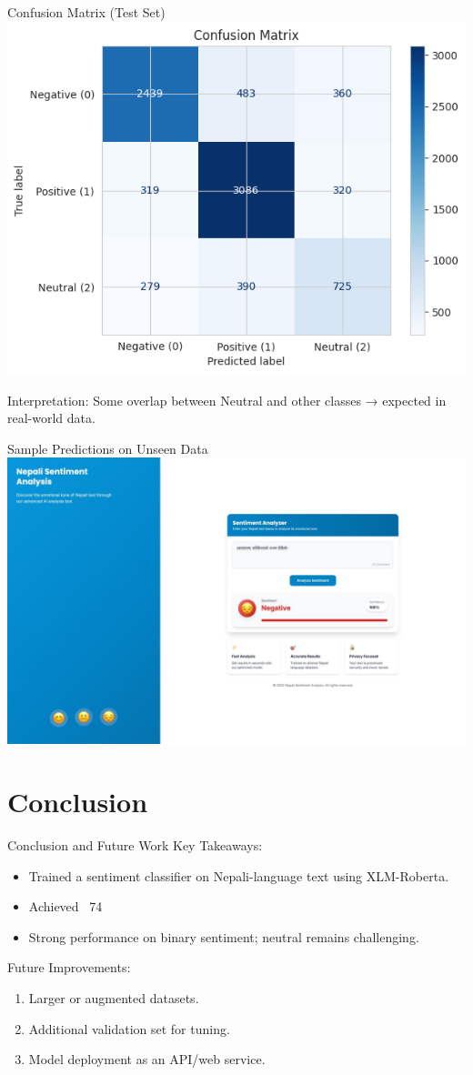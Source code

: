 \documentclass[aspectratio=169]{beamer}
\begin{document}
\begin{frame}{Confusion Matrix (Test Set)}
  \centering
  \includegraphics[width=0.45\linewidth]{confusion_matrix.png}

  Interpretation:
  Some overlap between Neutral and other classes → expected in real-world data.
\end{frame}

\begin{frame}{Sample Predictions on Unseen Data}
  \centering
  \includegraphics[width=0.75\linewidth]{visual.jpeg}
\end{frame}

\section{Conclusion}
\begin{frame}{Conclusion and Future Work}
  Key Takeaways:
  \begin{itemize}
    \item Trained a sentiment classifier on Nepali-language text using XLM-Roberta.
    \item Achieved ~74%
    \item Strong performance on binary sentiment; neutral remains challenging.
  \end{itemize}

  Future Improvements:
  \begin{enumerate}
    \item Larger or augmented datasets.
    \item Additional validation set for tuning.
    \item Model deployment as an API/web service.
  \end{enumerate}
\end{frame}
\end{document}
